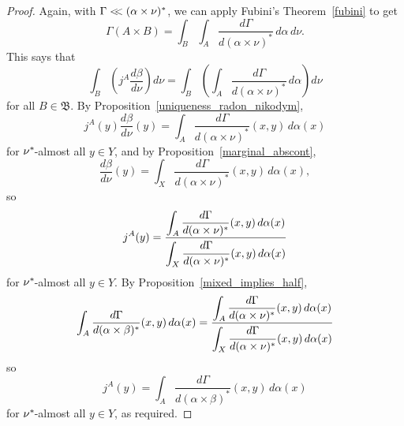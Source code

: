 \documentclass[
twoside=true,
paper=letter,
fontsize=9pt,
pagesize=auto,
leqno,
openany,
headsepline,
overfullrule,
]{scrbook}
\theoremstyle{plain}
\theoremstyle{plain}
\theoremstyle{definition}
\theoremstyle{bfnoteitalic}
\theoremstyle{bfnoteroman}
\newcommand{\sigalg}[1]{\mathfrak{#1}}
\newcommand{\sigmaalgebraii}{\sigalg{B}}
\newcommand{\kernast}{\ast\kern-1pt}
\newcommand{\lilstrut}{\vphantom{\bigl(}}
\newcommand{\funcj}{j}
\newcommand{\measurespace}{X}
\newcommand{\measurespaceii}{Y}
\newcommand{\mspaceelt}{x}
\newcommand{\mspaceeltii}{y}
\newcommand{\abscont}{\mathrel{< \kern-3.5pt <}}
\newcommand{\measnu}{\nu}
\newcommand{\seti}{A}
\newcommand{\setii}{B}
\newcommand{\measonprod}{\Gamma}%
\newcommand{\marginalone}{\alpha}%
\newcommand{\marginaltwo}{\beta}%
\begin{document}
\begin{proof}
Again, with
$\measonprod\abscont(\marginalone\times\measnu)^*$,
we can apply Fubini's Theorem~\ref{fubini} to get
\[
\measonprod(\seti\times\setii)
=
\int_\setii
\int_\seti
\dfrac{d\measonprod}{d(\marginalone\times\measnu)^*}
\, d\marginalone
\, d\measnu.
\]
This says that
\[
\int_\setii
\left( \funcj^\seti  \dfrac{d\marginaltwo}{d\measnu} \right)
d \measnu
=
\int_\setii
\left(
\int_\seti
\dfrac{d\measonprod}{d(\marginalone\times\measnu)^*}
\, d\marginalone
\right)
d\measnu
\]
for all $\setii\in\sigmaalgebraii$.
By Proposition~\ref{uniqueness_radon_nikodym},
\[
\funcj^\seti(\mspaceeltii)  \dfrac{d\marginaltwo}{d\measnu}(\mspaceeltii)
=
\int_\seti
\dfrac{d\measonprod}{d(\marginalone\times\measnu)^*}(\mspaceelt,\mspaceeltii)
\, d\marginalone(\mspaceelt)
\]
for $\measnu^\kernast$\hyp{}almost all $\mspaceeltii\in\measurespaceii$,
and by Proposition~\ref{marginal_abscont},
\[
\frac{d \marginaltwo}
{d\measnu}(\mspaceeltii)
=
\int_{\measurespace}
\frac{d\measonprod}{d(\marginalone\times\measnu)^*}
(\mspaceelt,\mspaceeltii)\,d\marginalone(\mspaceelt),
\]
so
\[
\funcj^\seti(\mspaceeltii)
=
\dfrac{\displaystyle \int_\seti
\dfrac{d\measonprod}{d(\marginalone\times\measnu)^*}(\mspaceelt,\mspaceeltii)
\, d\marginalone(\mspaceelt)}
{\displaystyle\int_{\measurespace}
\frac{d\measonprod\lilstrut}{d(\marginalone\times\measnu)^*}
(\mspaceelt,\mspaceeltii)\,d\marginalone(\mspaceelt)}
\]
for $\measnu^\kernast$\hyp{}almost all $\mspaceeltii\in\measurespaceii$.
By Proposition~\ref{mixed_implies_half},
\[
\int_\seti
\frac{d\measonprod}{d(\marginalone\times\marginaltwo)^*}
(\mspaceelt,\mspaceeltii)\,d\marginalone(\mspaceelt)
=
\frac{\displaystyle
\int_\seti
\dfrac{d\measonprod}{d(\marginalone\times\measnu)^*}(\mspaceelt,\mspaceeltii)
\,d\marginalone(\mspaceelt)
}
{\displaystyle
\int_\measurespace
\dfrac{d\measonprod\lilstrut}{d(\marginalone\times\measnu)^*}(\mspaceelt,\mspaceeltii)
\,d\marginalone(\mspaceelt)
}
\]
so
\[
\funcj^\seti(\mspaceeltii)
=
\int_\seti
\frac{d\measonprod}{d(\marginalone\times\marginaltwo)^*}
(\mspaceelt,\mspaceeltii)\,d\marginalone(\mspaceelt)
\]
for $\measnu^\kernast$\hyp{}almost all $\mspaceeltii\in\measurespaceii$,
as required.
\end{proof}
\end{document}
